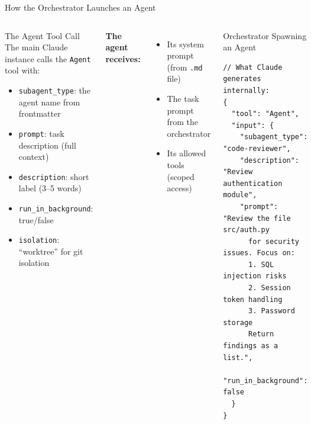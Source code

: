 \documentclass[aspectratio=169,xcolor=dvipsnames]{beamer}
\begin{document}
\begin{frame}[fragile]{How the Orchestrator Launches an Agent}
    \begin{columns}
        \begin{block}{The Agent Tool Call}
            The main Claude instance calls the \texttt{Agent} tool with:
            \begin{itemize}
                \item \texttt{subagent\_type}: the agent name from frontmatter
                \item \texttt{prompt}: task description (full context)
                \item \texttt{description}: short label (3--5 words)
                \item \texttt{run\_in\_background}: true/false
                \item \texttt{isolation}: ``worktree'' for git isolation
            \end{itemize}
        \end{block}
        \vspace{0.2cm}
        \textbf{The agent receives:}
        \begin{itemize}
            \item Its system prompt (from \texttt{.md} file)
            \item The task prompt from the orchestrator
            \item Its allowed tools (scoped access)
        \end{itemize}

        \begin{exampleblock}{Orchestrator Spawning an Agent}
                        \begin{lstlisting}[style=JSONStyle]
// What Claude generates internally:
{
  "tool": "Agent",
  "input": {
    "subagent_type": "code-reviewer",
    "description": "Review authentication module",
    "prompt": "Review the file src/auth.py
      for security issues. Focus on:
      1. SQL injection risks
      2. Session token handling
      3. Password storage
      Return findings as a list.",
    "run_in_background": false
  }
}
            \end{lstlisting}
        \end{exampleblock}
    \end{columns}
\end{frame}
\end{document}
